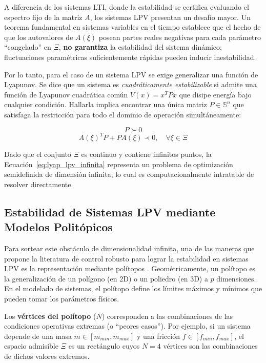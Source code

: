 A diferencia de los sistemas LTI, donde la estabilidad se certifica evaluando el espectro fijo de la matriz $A$, los sistemas LPV presentan un desafío mayor. Un teorema fundamental en sistemas variables en el tiempo establece que el hecho de que los autovalores de $A(\xi)$ posean partes reales negativas para cada parámetro ``congelado'' en $\Xi$, \textbf{no garantiza} la estabilidad del sistema dinámico; fluctuaciones paramétricas suficientemente rápidas pueden inducir inestabilidad.

Por lo tanto, para el caso de un sistema LPV se exige generalizar una función de Lyapunov. Se dice que un sistema es \textit{cuadráticamente estabilizable} si admite una función de Lyapunov cuadrática común $V(x) = x^T P x$ que disipe energía bajo cualquier condición. Hallarla implica encontrar una única matriz $P \in \mathbb{S}^n$ que satisfaga la restricción para todo el dominio de operación simultáneamente:

\begin{equation}
    P \succ 0
    \label{eq:P_positiva_lpv}
\end{equation}
\begin{equation}
    A(\xi)^T P + P A(\xi) \prec 0, \quad \forall \xi \in \Xi
    \label{eq:lyap_lpv_infinita}
\end{equation}

Dado que el conjunto $\Xi$ es continuo y contiene infinitos puntos, la Ecuación~\eqref{eq:lyap_lpv_infinita} representa un problema de optimización semidefinida de dimensión infinita, lo cual es computacionalmente intratable de resolver directamente. 

\subsection{Estabilidad de Sistemas LPV mediante Modelos Politópicos}

Para sortear este obstáculo de dimensionalidad infinita, una de las maneras que propone la literatura de control robusto para lograr la estabilidad en sistemas LPV es la representación mediante polítopos . Geométricamente, un polítopo es la generalización de un polígono (en 2D) o un poliedro (en 3D) a $p$ dimensiones. En el modelado de sistemas, el polítopo define los límites máximos y mínimos que pueden tomar los parámetros físicos. 

Los \textbf{vértices del polítopo} ($N$) corresponden a las combinaciones de las condiciones operativas extremas (o ``peores casos''). Por ejemplo, si un sistema depende de una masa $m \in [m_{min}, m_{max}]$ y una fricción $f \in [f_{min}, f_{max}]$, el espacio admisible $\Xi$ es un rectángulo cuyos $N=4$ vértices son las combinaciones de dichos valores extremos. 

